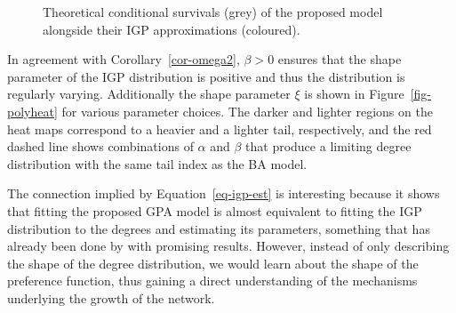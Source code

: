 \documentclass[
  sn-basic,
  10pt,
]{sn-jnl}
\theoremstyle{thmstyleone}
\theoremstyle{thmstyleone}
\theoremstyle{remark}
\theoremstyle{plain}
\theoremstyle{plain}
\theoremstyle{remark}
\begin{document}
\begin{figure}


\caption{\label{fig-approx_surv}Theoretical conditional survivals (grey)
of the proposed model alongside their IGP approximations (coloured).}

\end{figure}%

In agreement with Corollary~\ref{cor-omega2}, \(\beta>0\) ensures that
the shape parameter of the IGP distribution is positive and thus the
distribution is regularly varying. Additionally the shape parameter
\(\xi\) is shown in Figure~\ref{fig-polyheat} for various parameter
choices. The darker and lighter regions on the heat maps correspond to a
heavier and a lighter tail, respectively, and the red dashed line shows
combinations of \(\alpha\) and \(\beta\) that produce a limiting degree
distribution with the same tail index as the BA model.

The connection implied by Equation~\ref{eq-igp-est} is interesting
because it shows that fitting the proposed GPA model is almost
equivalent to fitting the IGP distribution to the degrees and estimating
its parameters, something that has already been done by \citet{Lee24}
with promising results. However, instead of only describing the shape of
the degree distribution, we would learn about the shape of the
preference function, thus gaining a direct understanding of the
mechanisms underlying the growth of the network.
\end{document}
